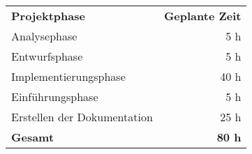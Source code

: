 \begin{tabular}{lr}
\rowcolor{heading}\textbf{Projektphase} & \textbf{Geplante Zeit} \\
Analysephase & 5 h \\
\rowcolor{odd}Entwurfsphase & 5 h \\
Implementierungsphase & 40 h \\
\rowcolor{odd}Einführungsphase & 5 h \\Erstellen der Dokumentation & 25 h \\
\hline
\hline
\rowcolor{odd}\textbf{Gesamt} & \textbf{80 h} \\
\end{tabular}
